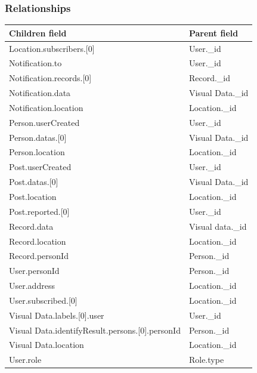 \subsubsection{Relationships}
\begin{table}[H]
\begin{tabular}{|l|l|}
\hline
\textbf{Children field}                                      & \textbf{Parent field}     \\ \hline
Location.subscribers.{[}0{]}                        & User.\_id        \\ \hline
Notification.to                                     & User.\_id        \\ \hline
Notification.records.{[}0{]}                        & Record.\_id      \\ \hline
Notification.data                                   & Visual Data.\_id \\ \hline
Notification.location                               & Location.\_id    \\ \hline
Person.userCreated                                  & User.\_id        \\ \hline
Person.datas.{[}0{]}                                & Visual Data.\_id \\ \hline
Person.location                                     & Location.\_id    \\ \hline
Post.userCreated                                    & User.\_id        \\ \hline
Post.datas.{[}0{]}                                  & Visual Data.\_id \\ \hline
Post.location                                       & Location.\_id    \\ \hline
Post.reported.{[}0{]}                               & User.\_id        \\ \hline
Record.data                                         & Visual data.\_id \\ \hline
Record.location                                     & Location.\_id    \\ \hline
Record.personId                                     & Person.\_id      \\ \hline
User.personId                                       & Person.\_id      \\ \hline
User.address                                        & Location.\_id    \\ \hline
User.subscribed.{[}0{]}                             & Location.\_id    \\ \hline
Visual Data.labels.{[}0{]}.user                     & User.\_id        \\ \hline
Visual Data.identifyResult.persons.{[}0{]}.personId & Person.\_id      \\ \hline
Visual Data.location                                & Location.\_id    \\ \hline
User.role                                           & Role.type        \\ \hline
\end{tabular}
\end{table}

